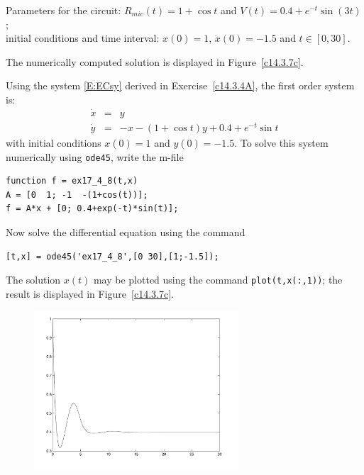 \documentclass{ximera}
\begin{document}
\begin{computerExercise} \label{c14.3.7c}
Parameters for the circuit: $R_{mic}(t) = 1+\cos t$ and $V(t) = 0.4+e^{-t}\sin(3t)$;\\
initial conditions and time interval: $x(0) = 1$, $\dot{x}(0) = -1.5$ and 
$t\in[0,30]$.

\begin{solution}
\ans The numerically computed solution is displayed in 
Figure~\ref{c14.3.7c}.

\soln  Using the system \eqref{E:ECsy} derived in 
Exercise~\ref{c14.3.4A}, the first order system is:
\begin{eqnarray*}
\dot{x} & = & y \\
\dot{y} & = & -x - (1+\cos t)y + 0.4 + e^{-t}\sin t
\end{eqnarray*}
with initial conditions $x(0)=1$ and $y(0)=-1.5$. To solve this system numerically 
using {\tt ode45}, write the m-file
\begin{verbatim}
function f = ex17_4_8(t,x)
A = [0  1; -1  -(1+cos(t))];
f = A*x + [0; 0.4+exp(-t)*sin(t)];
\end{verbatim}
Now solve the differential equation using the command
\begin{verbatim}
[t,x] = ode45('ex17_4_8',[0 30],[1;-1.5]);
\end{verbatim}
The solution $x(t)$ may be plotted using the command {\tt plot(t,x(:,1))}; the 
result is displayed in Figure~\ref{c14.3.7c}.
\begin{figure}[htb]
     \centerline{%
     \includegraphics[width=3.0in]{exfigure/fig17-4-8.pdf}}
\end{figure} 



\end{solution}
\end{computerExercise}
\end{document}
